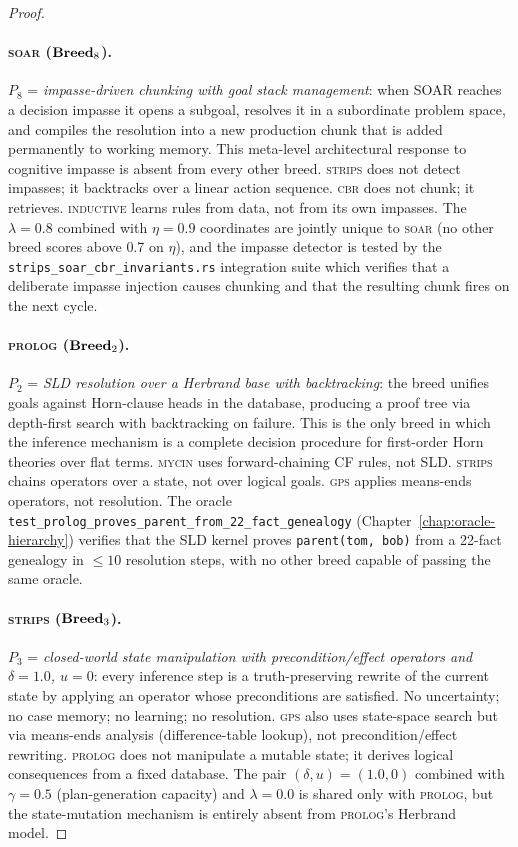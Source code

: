 \begin{proof}
\paragraph{\textsc{soar} ($\mathbf{Breed}_8$).}
$P_8$ = \emph{impasse-driven chunking with goal stack management}: when SOAR reaches a
decision impasse it opens a subgoal, resolves it in a subordinate problem space, and
compiles the resolution into a new production chunk that is added permanently to working
memory. This meta-level architectural response to cognitive impasse is absent from every
other breed. \textsc{strips} does not detect impasses; it backtracks over a linear action
sequence. \textsc{cbr} does not chunk; it retrieves. \textsc{inductive} learns rules from
data, not from its own impasses. The $\lambda = 0.8$ combined with $\eta = 0.9$
coordinates are jointly unique to \textsc{soar} (no other breed scores above 0.7 on
$\eta$), and the impasse detector is tested by the
\texttt{strips\_soar\_cbr\_invariants.rs} integration suite which verifies that a
deliberate impasse injection causes chunking and that the resulting chunk fires on the
next cycle.

\paragraph{\textsc{prolog} ($\mathbf{Breed}_2$).}
$P_2$ = \emph{SLD resolution over a Herbrand base with backtracking}: the breed unifies
goals against Horn-clause heads in the database, producing a proof tree via depth-first
search with backtracking on failure. This is the only breed in which the inference
mechanism is a complete decision procedure for first-order Horn theories over flat terms.
\textsc{mycin} uses forward-chaining CF rules, not SLD. \textsc{strips} chains operators
over a state, not over logical goals. \textsc{gps} applies means-ends operators, not
resolution. The oracle \texttt{test\_prolog\_proves\_parent\_from\_22\_fact\_genealogy}
(Chapter~\ref{chap:oracle-hierarchy}) verifies that the SLD kernel proves
\texttt{parent(tom, bob)} from a 22-fact genealogy in $\leq 10$ resolution steps, with
no other breed capable of passing the same oracle.

\paragraph{\textsc{strips} ($\mathbf{Breed}_3$).}
$P_3$ = \emph{closed-world state manipulation with precondition/effect operators and
$\delta = 1.0$, $u = 0$}: every inference step is a truth-preserving rewrite of the
current state by applying an operator whose preconditions are satisfied. No uncertainty;
no case memory; no learning; no resolution. \textsc{gps} also uses state-space search but
via means-ends analysis (difference-table lookup), not precondition/effect rewriting.
\textsc{prolog} does not manipulate a mutable state; it derives logical consequences from
a fixed database. The pair $(\delta, u) = (1.0, 0)$ combined with $\gamma = 0.5$
(plan-generation capacity) and $\lambda = 0.0$ is shared only with \textsc{prolog}, but
the state-mutation mechanism is entirely absent from \textsc{prolog}'s Herbrand model.


\end{proof}
